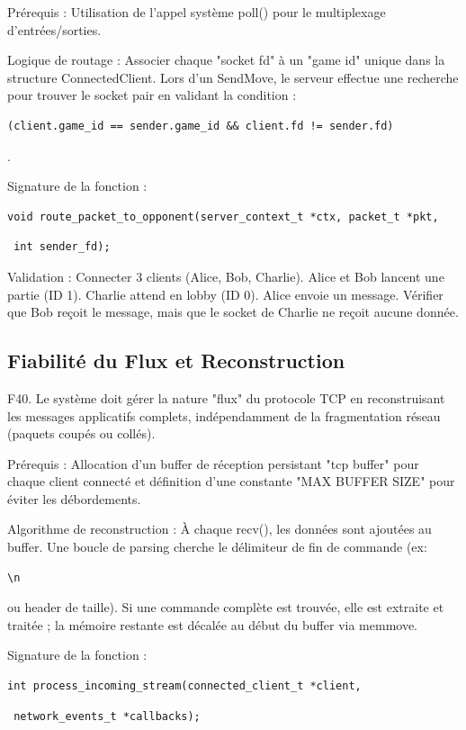 \documentclass[12pt,a4paper,titlepage,oneside]{article}
\begin{document}
    Prérequis : Utilisation de l'appel système poll() pour le multiplexage d'entrées/sorties.
    
    Logique de routage : Associer chaque "socket fd" à un "game id" unique dans la structure ConnectedClient. Lors d'un SendMove, le serveur effectue une recherche pour trouver le socket pair en validant la condition : \begin{verbatim}(client.game_id == sender.game_id && client.fd != sender.fd)\end{verbatim}.

    \newpage
    Signature de la fonction : \begin{verbatim}void route_packet_to_opponent(server_context_t *ctx, packet_t *pkt,\end{verbatim} \smallskip \begin{verbatim} int sender_fd);\end{verbatim}
    
    Validation : Connecter 3 clients (Alice, Bob, Charlie). Alice et Bob lancent une partie (ID 1). Charlie attend en lobby (ID 0). Alice envoie un message. Vérifier que Bob reçoit le message, mais que le socket de Charlie ne reçoit aucune donnée.
    
    \subsection{Fiabilité du Flux et Reconstruction} 
    F40. Le système doit gérer la nature "flux" du protocole TCP en reconstruisant les messages applicatifs complets, indépendamment de la fragmentation réseau (paquets coupés ou collés).
    
    Prérequis : Allocation d'un buffer de réception persistant "tcp buffer" pour chaque client connecté et définition d'une constante "MAX BUFFER SIZE" pour éviter les débordements.
    
    Algorithme de reconstruction : À chaque recv(), les données sont ajoutées au buffer. Une boucle de parsing cherche le délimiteur de fin de commande (ex: \begin{verbatim}\n\end{verbatim} ou header de taille). Si une commande complète est trouvée, elle est extraite et traitée ; la mémoire restante est décalée au début du buffer via memmove.
    
    Signature de la fonction : \begin{verbatim}int process_incoming_stream(connected_client_t *client,\end{verbatim} \smallskip \begin{verbatim} network_events_t *callbacks);\end{verbatim}
    
\end{document}

